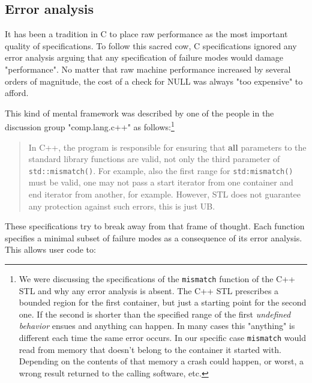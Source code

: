 \subsection{Error analysis}
It has been a  tradition in C to place raw performance as the most important quality of specifications. To follow this sacred cow, C specifications
ignored any error analysis arguing that any specification of failure modes would damage "performance". No matter that raw machine performance
increased by several orders of magnitude, the cost of  a check for NULL was always "too expensive" to afford.

This kind of mental framework was described by one of the people in the discussion group "comp.lang.c++" as follows:\footnote{We were discussing 
the specifications of the \texttt{mismatch} function of the C++ STL and why any error analysis is absent. The C++ STL prescribes a bounded 
region for the first container, but just a starting point for the second one. If the second is shorter than the specified range of the first
 \textsl{undefined behavior} ensues and anything can happen. In many cases this "anything" is different each time the same error occurs. In our
specific case \texttt{mismatch} would read from memory that doesn't belong to the container it started with. Depending on the contents of
that memory a crash could happen, or worst, a wrong result returned to the calling software, etc.}
\begin{quotation}
 In C++, the program is responsible for ensuring that \textbf{all} parameters to
 the standard library functions are valid, not only the third parameter of
 \texttt{std::mismatch()}. For example, also the first range for \texttt{std:mismatch()}
 must be valid, one may not pass a start iterator from one container and
 end iterator from another, for example. However, STL does not guarantee
 any protection against such errors, this is just UB.
\end{quotation}
These specifications try to break away from that frame of thought. Each function specifies a minimal subset of failure modes as a consequence of its 
error analysis. This allows user code to:
